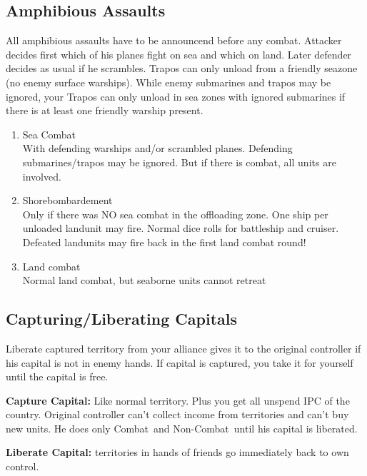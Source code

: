 \documentclass[10pt,a4paper,landscape]{article}
\begin{document}
\begin{multicols*}{3}
\subsection*{Amphibious Assaults}
All amphibious assaults have to be announcend before any combat. Attacker decides first which of his planes fight on sea and which on land. Later defender decides as usual if he scrambles. Trapos can only unload from a friendly seazone (no enemy surface warships). While enemy submarines and trapos may be ignored, your Trapos can only unload in sea zones with ignored submarines if there is at least one friendly warship present.
\begin{enumerate}
\item Sea Combat\\
With defending warships and/or scrambled planes. Defending submarines/trapos may be ignored. But if there is combat, all units are involved.
\item Shorebombardement\\
Only if there was NO sea combat in the offloading zone.  One ship per unloaded landunit may fire. Normal dice rolls for battleship and cruiser. Defeated landunits may fire back in the first land combat round!
\item Land combat\\
Normal land combat, but seaborne units cannot retreat
\end{enumerate}

\subsection*{Capturing/Liberating Capitals}
Liberate captured territory from your alliance gives it to the original controller if his capital is not in enemy hands. If capital is captured, you take it for yourself until the capital is free.

\textbf{Capture Capital:} Like normal territory. Plus you get all unspend IPC of the country. Original controller can't collect income from territories and can't buy new units. He does only \glqq Combat\grqq\ and \glqq Non-Combat\grqq\ until his capital is liberated.

\textbf{Liberate Capital:} territories in hands of friends go immediately back to own control.


\end{multicols*}
\end{document}
